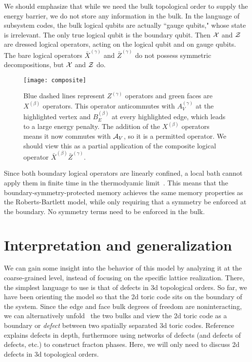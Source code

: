 We should emphasize that while we need the bulk topological order to supply the energy barrier, we do not store any information in the bulk. In the language of subsystem codes, the bulk logical qubits are actually ``gauge qubits," whose state is irrelevant.
The only true logical qubit is the boundary qubit. Then $\cal{X}$ and $\cal{Z}$ are dressed logical operators, acting on the logical qubit and on gauge qubits. The bare logical operators $\bar{X}^{(\gamma)}$ and $\bar{Z}^{(\gamma)}$ do not possess symmetric decompositions, but $\cal{X}$ and $\cal{Z}$ do.

\begin{figure}[th!]
\centering
\texttt{[image: composite]}
\caption[An allowed, but penalized, operator]{Blue dashed lines represent $Z^{(\gamma)}$ operators and green faces are $X^{(\beta)}$ operators. This operator anticommutes with $A_V^{(\gamma)}$ at the highlighted vertex and $B_E^{(\beta)}$ at every highlighted edge, which leads to a large energy penalty. The addition of the $X^{(\beta)}$ operators means it now commutes with $\cal{A}_V$, so it is a permitted operator. We should view this as a partial application of the composite logical operator $\bar{X}^{(\beta)} \bar{Z}^{(\gamma)}$.}
\label{fig:composite}
\end{figure}

Since both boundary logical operators are linearly confined, a local bath cannot apply them in finite time in the thermodyamic limit~\cite{RobertsBartlett2020}. This means that the boundary-symmetry-protected memory achieves the same memory properties as the Roberts-Bartlett model, while only requiring that a symmetry be enforced at the boundary. No symmetry terms need to be enforced in the bulk.

\section{Interpretation and generalization} \label{sec:interp}

We can gain some insight into the behavior of this model by analyzing it at the coarse-grained level, instead of focusing on the specific lattice realization. There, the simplest language to use is that of defects in 3d topological orders. So far, we have been orienting the model so that the 2d toric code sits on the boundary of the system. Since the edge and face bulk degrees of freedom are noninteracting, we can alternatively unfold~\cite{KitaevKong2012} the two bulks and view the 2d toric code as a boundary or \emph{defect} between two spatially separated 3d toric codes. Reference~\cite{Aasen2020Defect} explains defects in depth, furthermore using networks of defects (and defects of defects, etc.) to construct fracton phases. Here, we will only need to discuss 2d defects in 3d topological orders. 

